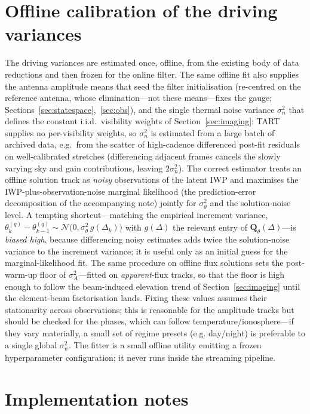 \documentclass[11pt]{article}
\newcommand{\Norm}{\mathcal{N}}
\begin{document}
\section{Offline calibration of the driving variances}
\label{sec:hyper}

The driving variances are estimated once, offline, from the existing body of data reductions and then
frozen for the online filter. The same offline fit also supplies the antenna amplitude means that
seed the filter initialisation (re-centred on the reference antenna, whose elimination---not these
means---fixes the gauge; Sections~\ref{sec:statespace},~\ref{sec:obs}), and the single thermal noise
variance $\sigma_n^2$ that defines the constant i.i.d.\ visibility weights of
Section~\ref{sec:imaging}: TART supplies no per-visibility weights, so $\sigma_n^2$ is estimated
from a large batch of archived data, e.g.\ from the scatter of high-cadence differenced post-fit
residuals on well-calibrated stretches (differencing adjacent frames cancels the slowly varying sky
and gain contributions, leaving $2\sigma_n^2$). The
correct estimator treats an offline solution track as \emph{noisy} observations of the latent IWP and
maximises the IWP-plus-observation-noise marginal likelihood (the prediction-error decomposition of the
accompanying note) jointly for $\sigma_\theta^2$ and the solution-noise level. A tempting shortcut---matching
the empirical increment variance, $\theta^{(q)}_k-\theta^{(q)}_{k-1}\sim\Norm\!\big(0,\sigma_\theta^2\,g(\Delta_k)\big)$
with $g(\Delta)$ the relevant entry of $\bm{Q}_\theta(\Delta)$---is \emph{biased high}, because
differencing noisy estimates adds twice the solution-noise variance to the increment variance; it is
useful only as an initial guess for the marginal-likelihood fit. The same procedure on offline flux
solutions sets the post-warm-up floor of $\sigma_A^2$---fitted on \emph{apparent}-flux tracks, so
that the floor is high enough to follow the beam-induced elevation trend of
Section~\ref{sec:imaging} until the element-beam factorisation lands. Fixing these values assumes their stationarity
across observations; this is reasonable for the amplitude tracks but should be checked for the phases,
which can follow temperature/ionosphere---if they vary materially, a small set of regime presets (e.g.
day/night) is preferable to a single global $\sigma_\psi^2$. The fitter is a small offline utility
emitting a frozen hyperparameter configuration; it never runs inside the streaming pipeline.

\section{Implementation notes}
\label{sec:notes}
\end{document}
